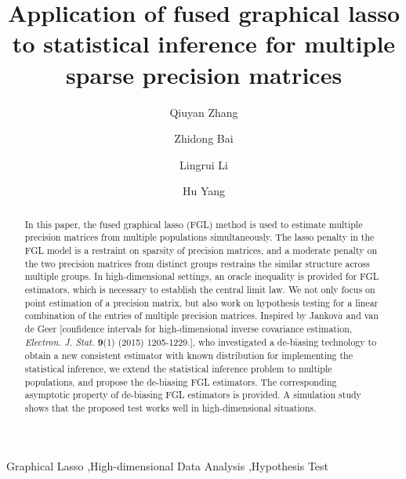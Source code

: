 \documentclass[review]{elsarticle}
\newcommand{\1}{{\bf 1}}
\newcommand{\0}{{\bf 0}}
\begin{document}
\begin{frontmatter}


\title{Application of fused graphical lasso to statistical inference for multiple sparse precision matrices}


\author[mymainaddress]{Qiuyan Zhang}
\address[mymainaddress]{School of Statistics, Capital University of Economics and Business, Beijing}

\author[mysecondaryaddress]{Zhidong Bai}
\address[mysecondaryaddress]{KLASMOE and School of Mathematics and Statistics, Northeast Normal University, Changchun, Jilin}

\author[mymainaddress]{Lingrui Li}

\author[add3]{Hu Yang}
\address[add3]{School of Information, Central University of Finance and Economics, Beijing}


\begin{abstract}
 In this paper, the fused graphical lasso (FGL) method is used to estimate multiple precision matrices from multiple populations simultaneously.
 The lasso penalty in the FGL model is a restraint on sparsity of precision matrices, and a moderate penalty on the two precision matrices from distinct groups restrains the similar structure across multiple groups.
 In high-dimensional settings, an oracle inequality is provided for FGL estimators, which is necessary to establish the central limit law.
 We not only focus on point estimation of a precision matrix, but also work on hypothesis testing for a linear combination of the entries of multiple precision matrices.
 Inspired by Jankov$\acute{a}$ and van de Geer [confidence intervals for high-dimensional inverse covariance estimation, {\it Electron. J. Stat.} {\bf 9}(1) (2015) 1205-1229.], who investigated a de-biasing technology to obtain a new consistent estimator with known distribution for implementing the statistical inference, we extend the statistical inference problem to multiple populations, and propose the de-biasing FGL estimators.
 The corresponding asymptotic property of de-biasing FGL estimators is provided.
 A simulation study shows that the proposed test works well in high-dimensional situations.
\end{abstract}

\begin{keyword}
 Graphical Lasso \sep High-dimensional Data Analysis \sep Hypothesis Test
\end{keyword}

\end{frontmatter}
\end{document}
